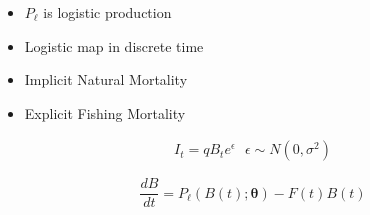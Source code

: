 \documentclass[ xcolor = pdftex, dvipsnames, table ]{beamer}
\begin{document}
%
\begin{frame}
	\begin{minipage}[h!]{0.59\textwidth}
	\begin{itemize}
	\setlength\itemsep{1em}
	\item $P_\ell$ is logistic production
	\item Logistic map in discrete time 
	\item Implicit Natural Mortality
	\item Explicit Fishing Mortality 
	\end{itemize}
	\end{minipage}
	\begin{minipage}[h!]{0.39\textwidth}
        \begin{align*}
        I_t = q B_t e^\epsilon ~~~ \epsilon\sim N(0, \sigma^2)
        \end{align*}

        \begin{equation*}
        \frac{dB}{dt} = P_\ell(B(t); \bm{\theta}) - F(t)B(t)
        \end{equation*}
	\end{minipage}
\end{frame}
\end{document}

